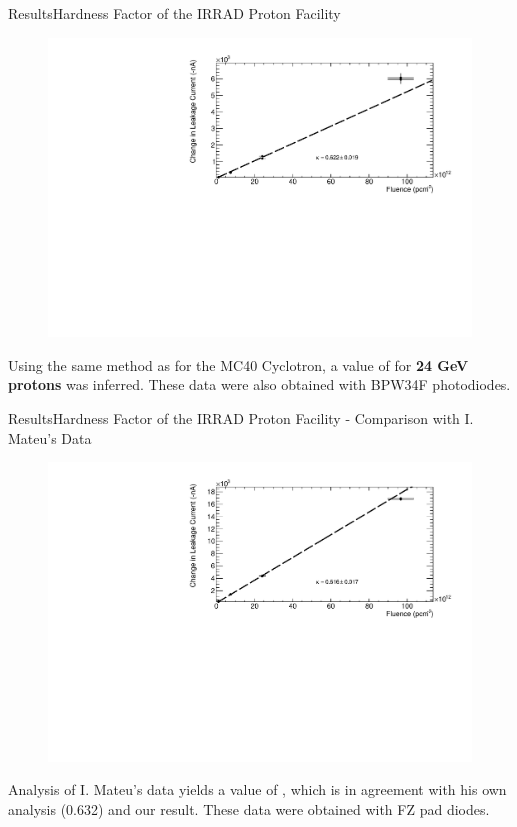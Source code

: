 \documentclass{beamer}
\begin{document}
    \begin{frame}{Results}{Hardness Factor of the IRRAD Proton Facility}
        \begin{figure}
            \centering
            \includegraphics[width = 0.9\linewidth]{IRRAD_seminar.pdf}
        \end{figure}
    Using the same method as for the MC40 Cyclotron, a value of  for \textbf{24 GeV protons} was inferred. These data were also obtained with BPW34F photodiodes.
    \end{frame}
    
    \begin{frame}{Results}{Hardness Factor of the IRRAD Proton Facility - Comparison with I. Mateu's Data}
        \begin{figure}
            \centering
            \includegraphics[width = 0.9\linewidth]{Isidre_seminar.pdf}
        \end{figure}
    \vspace{-0.5cm}
    Analysis of I. Mateu's data yields a value of , which is in agreement with his own analysis (0.632) and our result. These data were obtained with FZ pad diodes.
    \end{frame}
    
\end{document}
